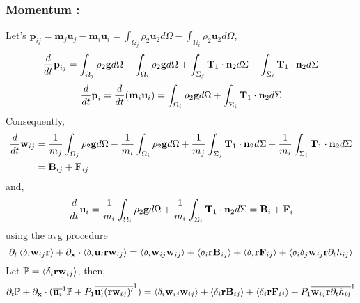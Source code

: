 \subsubsection*{Momentum :}
Let's $\textbf{p}_{ij} = \textbf{m}_j \textbf{u}_j-\textbf{m}_i \textbf{u}_i =\int_{\Omega_j}\rho_2 \textbf{u}_2d\Omega
- \int_{\Omega_i}\rho_2 \textbf{u}_2d\Omega$, 
\begin{equation}
\frac{d}{d t} \textbf{p}_{ij} 
= \int_{\Omega_j}\rho_2\textbf{g}d\Omega 
- \int_{\Omega_i}\rho_2\textbf{g}d\Omega
+ \int_{\Sigma_j} \textbf{T}_1 \cdot \textbf{n}_2d\Sigma
-\int_{\Sigma_i} \textbf{T}_1 \cdot \textbf{n}_2d\Sigma
\end{equation}
\begin{equation}
\frac{d}{d t} \textbf{p}_{i} 
= \frac{d}{d t} (\textbf{m}_i \textbf{u}_i)
= \int_{\Omega_i}\rho_2\textbf{g}d\Omega
+ \int_{\Sigma_i} \textbf{T}_1 \cdot \textbf{n}_2d\Sigma
\end{equation}
Consequently, 
\begin{align*}
    \frac{d}{d t} \textbf{w}_{ij} 
    &= \frac{1}{m_j}\int_{\Omega_j}\rho_2\textbf{g}d\Omega 
    - \frac{1}{m_i}\int_{\Omega_i}\rho_2\textbf{g}d\Omega
    + \frac{1}{m_j}\int_{\Sigma_j} \textbf{T}_1 \cdot \textbf{n}_2d\Sigma
    - \frac{1}{m_i}\int_{\Sigma_i} \textbf{T}_1 \cdot \textbf{n}_2d\Sigma\\
    &=\textbf{B}_{ij} + \textbf{F}_{ij}
\end{align*}
and, 
\begin{equation}
    \frac{d}{d t} \textbf{u}_{i} 
    = \frac{1}{m_i}\int_{\Omega_i}\rho_2\textbf{g}d\Omega
    + \frac{1}{m_i}\int_{\Sigma_i} \textbf{T}_1 \cdot \textbf{n}_2d\Sigma
    = \textbf{B}_i + \textbf{F}_i
\end{equation}
using the avg procedure 
\begin{equation*}
    \partial_t \left<\delta_i\textbf{w}_{ij}\textbf{r}\right> 
  + \partial_\textbf{x} \cdot \left<\delta_i\textbf{u}_i \textbf{r}\textbf{w}_{ij}\right>
  = \left<\delta_i\textbf{w}_{ij}\textbf{w}_{ij}\right>
  + \left<\delta_i\textbf{r} \textbf{B}_{ij}\right> 
  + \left<\delta_i\textbf{r} \textbf{F}_{ij}\right> 
  + \left<\delta_i\delta_{j}\textbf{w}_{ij}\textbf{r}\partial_t h_{ij} \right>
\end{equation*}
Let $\mathbb{P} = \left<\delta_i \textbf{rw}_{ij}\right>$, then, 
\begin{equation*}
    \partial_t \mathbb{P} 
  + \partial_\textbf{x} \cdot (\overline{\textbf{u}_i}^{1} \mathbb{P}
  + P_1\overline{\textbf{u}_i' (\textbf{r}\textbf{w}_{ij})'}^{1})
  = \left<\delta_i\textbf{w}_{ij}\textbf{w}_{ij}\right>
  + \left<\delta_i\textbf{r} \textbf{B}_{ij}\right> 
  + \left<\delta_i\textbf{r} \textbf{F}_{ij}\right> 
  + P_1\overline{\textbf{w}_{ij}\textbf{r}\partial_t h_{ij}}^{1}
\end{equation*}

